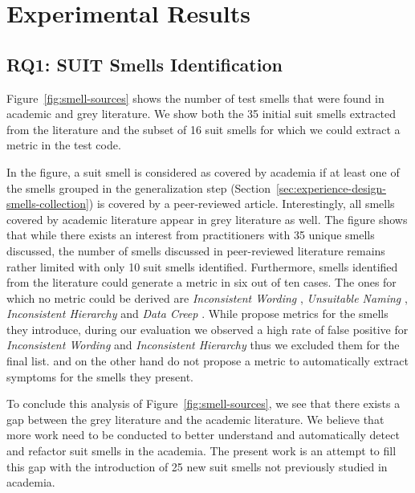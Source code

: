 \section{Experimental Results}
\label{sec:results}

\subsection{RQ1: SUIT Smells Identification}
\label{sec:results-smells-collection}

Figure~\ref{fig:smell-sources} shows the number of test smells that were found in academic and grey literature. We show both the 35 initial \gls{suit} smells extracted from the literature and the subset of 16 \gls{suit} smells for which we could extract a metric in the test code.

In the figure, a \gls{suit} smell is considered as covered by academia if at least one of the smells grouped in the generalization step (Section~\ref{sec:experience-design-smells-collection}) is covered by a peer-reviewed article. Interestingly, all smells covered by academic literature appear in grey literature as well. The figure shows that while there exists an interest from practitioners with 35 unique smells discussed, the number of smells discussed in peer-reviewed literature remains rather limited with only 10 \gls{suit} smells identified. Furthermore, smells identified from the literature could generate a metric in six out of ten cases. The ones for which no metric could be derived are \emph{Inconsistent Wording} \cite{Hauptmann2013}, \emph{Unsuitable Naming} \cite{Chen2012}, \emph{Inconsistent Hierarchy} \cite{Hauptmann2013} and \emph{Data Creep} \cite{Alegroth2016b}. While \cite{Hauptmann2013} propose metrics for the smells they introduce, during our evaluation we observed a high rate of false positive for \emph{Inconsistent Wording} and \emph{Inconsistent Hierarchy} thus we excluded them for the final list. \cite{Chen2012} and \cite{Alegroth2016b} on the other hand do not propose a metric to automatically extract symptoms for the smells they present. 

To conclude this analysis of Figure~\ref{fig:smell-sources}, we see that there exists a gap between the grey literature and the academic literature. We believe that more work need to be conducted to better understand and automatically detect and refactor \gls{suit} smells in the academia. The present work is an attempt to fill this gap with the introduction of 25 new \gls{suit} smells not previously studied in academia.


